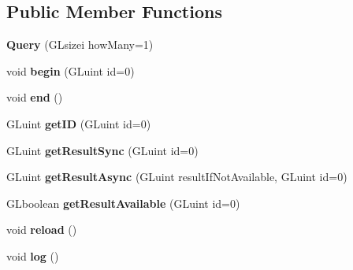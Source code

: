 \subsection*{Public Member Functions}
\begin{DoxyCompactItemize}
\item 
\hypertarget{classfillwave_1_1core_1_1Query_ab1c259391277bccf2407a72638550687}{}{\bfseries Query} (G\+Lsizei how\+Many=1)\label{classfillwave_1_1core_1_1Query_ab1c259391277bccf2407a72638550687}

\item 
\hypertarget{classfillwave_1_1core_1_1Query_a15b1f1e23cf66f89ac976a3aef040c9f}{}void {\bfseries begin} (G\+Luint id=0)\label{classfillwave_1_1core_1_1Query_a15b1f1e23cf66f89ac976a3aef040c9f}

\item 
\hypertarget{classfillwave_1_1core_1_1Query_a1750f7a31bfc60a362ed009cdb1748e4}{}void {\bfseries end} ()\label{classfillwave_1_1core_1_1Query_a1750f7a31bfc60a362ed009cdb1748e4}

\item 
\hypertarget{classfillwave_1_1core_1_1Query_a033135bcffcb9d61bb0751c38ef36f26}{}G\+Luint {\bfseries get\+I\+D} (G\+Luint id=0)\label{classfillwave_1_1core_1_1Query_a033135bcffcb9d61bb0751c38ef36f26}

\item 
\hypertarget{classfillwave_1_1core_1_1Query_a650596444148265e1de9471717b67e45}{}G\+Luint {\bfseries get\+Result\+Sync} (G\+Luint id=0)\label{classfillwave_1_1core_1_1Query_a650596444148265e1de9471717b67e45}

\item 
\hypertarget{classfillwave_1_1core_1_1Query_a8c0b187b72dec40a2eda132ecb516cf6}{}G\+Luint {\bfseries get\+Result\+Async} (G\+Luint result\+If\+Not\+Available, G\+Luint id=0)\label{classfillwave_1_1core_1_1Query_a8c0b187b72dec40a2eda132ecb516cf6}

\item 
\hypertarget{classfillwave_1_1core_1_1Query_af583a9cce081b03dc0dc4adc240ad1e0}{}G\+Lboolean {\bfseries get\+Result\+Available} (G\+Luint id=0)\label{classfillwave_1_1core_1_1Query_af583a9cce081b03dc0dc4adc240ad1e0}

\item 
\hypertarget{classfillwave_1_1core_1_1Query_aecd65a5f743252feec9382ea9f1427ef}{}void {\bfseries reload} ()\label{classfillwave_1_1core_1_1Query_aecd65a5f743252feec9382ea9f1427ef}

\item 
\hypertarget{classfillwave_1_1core_1_1Query_a781e0454d6ec6ceb3c40b72900d79e86}{}void {\bfseries log} ()\label{classfillwave_1_1core_1_1Query_a781e0454d6ec6ceb3c40b72900d79e86}

\end{DoxyCompactItemize}

